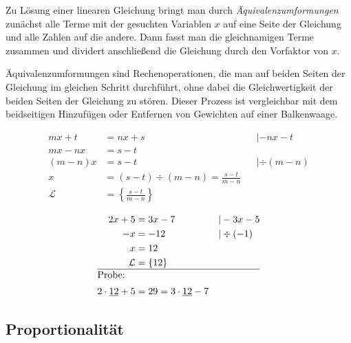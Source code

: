 \begin{regel}
 Zu Lösung einer linearen Gleichung bringt man durch \emph{Äquivalenzumformungen} zunächst alle Terme mit der gesuchten Variablen \(x\) auf eine Seite der Gleichung und alle Zahlen auf die andere. Dann fasst man die gleichnamigen Terme zusammen und dividert anschließend die Gleichung durch den Vorfaktor von \(x\).
 
 Äquivalenzumformungen sind Rechenoperationen, die man auf beiden Seiten der Gleichung im gleichen Schritt durchführt, ohne dabei die Gleichwertigkeit der beiden Seiten der Gleichung zu stören. Dieser Prozess ist vergleichbar mit dem beidseitigen Hinzufügen oder Entfernen von Gewichten auf einer Balkenwaage.
 
 \begin{align*}
  mx + t &= nx +s && | -nx -t \\
  mx-nx &= s-t \\
  (m-n)x &= s-t && | \div (m-n) \\
  x&= (s-t)\div(m-n) =  \frac{s-t}{m-n}\\
  \mathcal{L} &= \left\lbrace \frac{s-t}{m-n} \right\rbrace
 \end{align*}
 
\end{regel}

\begin{bsp}
 \begin{align*}
  2x+5 &= 3x -7 &&|-3x-5 \\
  -x &=-12 &&| \div (-1) \\
  x &= 12 \\
  \mathcal{L}&= \lbrace 12\rbrace \\\hline
  \intertext{Probe:}
  2\cdot \underline{12} +5 &=29 = 3\cdot \underline{12}-7
 \end{align*}

\end{bsp}

\subsection{Proportionalität}

